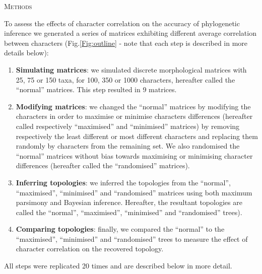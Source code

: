\documentclass[12pt,letterpaper]{article}
\renewcommand{\section}[1]{%
\bigskip
\begin{center}
\begin{Large}
\normalfont\scshape #1
\medskip
\end{Large}
\end{center}}
\begin{document}
\section{Methods}
To assess the effects of character correlation on the accuracy of phylogenetic inference we generated a series of matrices exhibiting different average correlation between characters (Fig.\ref{Fig:outline} - note that each step is described in more details below):
\begin{enumerate}
    \item \textbf{Simulating matrices}: we simulated discrete morphological matrices with 25, 75 or 150 taxa, for 100, 350 or 1000 characters, hereafter called the ``normal'' matrices. This step resulted in 9 matrices.

    \item \textbf{Modifying matrices}: we changed the ``normal'' matrices by modifying the characters in order to maximise or minimise characters differences (hereafter called respectively ``maximised'' and ``minimised'' matrices) by removing respectively the least different or most different characters and replacing them randomly by characters from the remaining set.
    We also randomised the ``normal'' matrices without bias towards maximising or minimising character differences (hereafter called the ``randomised'' matrices).

    \item \textbf{Inferring topologies}: we inferred the topologies from the ``normal'', ``maximised'', ``minimised'' and ``randomised'' matrices using both maximum parsimony and Bayesian inference.
    Hereafter, the resultant topologies are called the ``normal'', ``maximised'', ``minimised'' and ``randomised'' trees).

    \item \textbf{Comparing topologies}: finally, we compared the ``normal'' to the ``maximised'', ``minimised'' and ``randomised'' trees to measure the effect of character correlation on the recovered topology.

\end{enumerate}
All steps were replicated 20 times and are described below in more detail.
\end{document}
